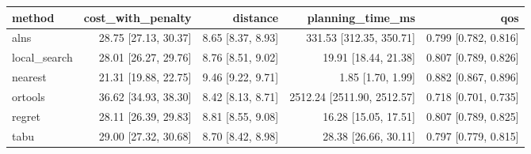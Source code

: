 \begin{tabular}{lrrrr}
\toprule
method & cost\_with\_penalty & distance & planning\_time\_ms & qos \\
\midrule
alns & 28.75 [27.13, 30.37] & 8.65 [8.37, 8.93] & 331.53 [312.35, 350.71] & 0.799 [0.782, 0.816] \\
local\_search & 28.01 [26.27, 29.76] & 8.76 [8.51, 9.02] & 19.91 [18.44, 21.38] & 0.807 [0.789, 0.826] \\
nearest & 21.31 [19.88, 22.75] & 9.46 [9.22, 9.71] & 1.85 [1.70, 1.99] & 0.882 [0.867, 0.896] \\
ortools & 36.62 [34.93, 38.30] & 8.42 [8.13, 8.71] & 2512.24 [2511.90, 2512.57] & 0.718 [0.701, 0.735] \\
regret & 28.11 [26.39, 29.83] & 8.81 [8.55, 9.08] & 16.28 [15.05, 17.51] & 0.807 [0.789, 0.825] \\
tabu & 29.00 [27.32, 30.68] & 8.70 [8.42, 8.98] & 28.38 [26.66, 30.11] & 0.797 [0.779, 0.815] \\
\bottomrule
\end{tabular}
